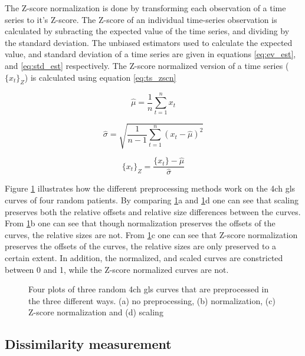 The Z-score normalization is done by transforming each observation of a time series to it's Z-score. The Z-score of an individual time-series observation is calculated by subracting the expected value of the time series, and dividing by the standard deviation. The unbiased estimators used to calculate the expected value, and standard deviation of a time series are given in equations \eqref{eq:ev_est}, and \eqref{eq:std_est} respectively. The Z-score normalized version of a time series ($\{x_t\}_Z$) is calculated using equation \eqref{eq:ts_zscn}

\begin{equation}
    \hat{\mu} = \frac{1}{n} \sum^n_{t = 1} x_t
    \label{eq:ev_est}
\end{equation}

\begin{equation}
    \hat{\sigma} = \sqrt{\frac{1}{n - 1} \sum^n_{t = 1} (x_t - \hat{\mu})^2}
    \label{eq:std_est}
\end{equation}

\begin{equation}
    \{x_t\}_Z = \frac{\{x_t\} - \hat{\mu}}{\hat{\sigma}}
    \label{eq:ts_zscn}
\end{equation}

Figure \ref{fig:preproc} illustrates how the different preprocessing methods work on the \acrshort{4ch} \acrshort{gls} curves of four random patients. By comparing \ref{fig:preproc}a and \ref{fig:preproc}d one can see that scaling preserves both the relative offsets and relative size differences between the curves. From \ref{fig:preproc}b one can see that though normalization preserves the offsets of the curves, the relative sizes are not. From \ref{fig:preproc}c one can see that Z-score normalization preserves the offsets of the curves, the relative sizes are only preserved to a certain extent. In addition, the normalized, and scaled curves are constricted between 0 and 1, while the Z-score normalized curves are not. 

\begin{figure}
    \centering
    
    \caption{Four plots of three random \acrshort{4ch} \acrshort{gls} curves that are preprocessed in the three different ways. (a) no preprocessing, (b) normalization, (c) Z-score normalization and (d) scaling}
    \label{fig:preproc}
\end{figure}

\subsection{Dissimilarity measurement}

